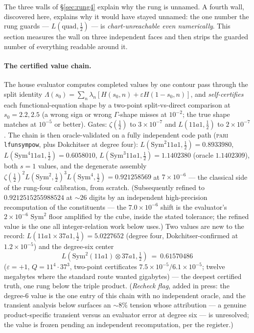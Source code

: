 \documentclass[11pt]{article}
\theoremstyle{definition}
\theoremstyle{remark}
\begin{document}
The three walls of \S\ref{sec:rung4} explain why the rung is unnamed. A fourth
wall, discovered here, explains why it would have stayed unnamed: the one
number the rung guards --- $L(\mathrm{quad},\tfrac12)$ --- is
\emph{chart-unreachable even numerically}. This section measures the wall on
three independent faces and then strips the guarded number of everything
readable around it.

\paragraph{The certified value chain.} The house evaluator computes completed
values by one contour pass through the split identity
$\Lambda(s_0)=\sum_n\lambda_n[H(s_0,n)+\varepsilon H(1-s_0,n)]$, and
\emph{self-certifies} each functional-equation shape by a two-point
split-vs-direct comparison at $s_0=2.2,2.5$ (a wrong sign or wrong
$\Gamma$-shape misses at $10^{-2}$; the true shape matches at $10^{-5}$ or
better). Gates: $\zeta(\tfrac12)$ to $3\times10^{-7}$ and $L(11a1,\tfrac12)$
to $2\times10^{-7}$. The chain is then oracle-validated on a fully independent
code path (\textsc{pari} \texttt{lfunsympow}, plus Dokchitser at degree four):
$L(\mathrm{Sym}^2 11a1,\tfrac12)=0.8933980$,
$L(\mathrm{Sym}^4 11a1,\tfrac12)=0.6058010$,
$L(\mathrm{Sym}^3 11a1,\tfrac12)=1.1402380$ (oracle $1.1402309$), both $s=1$
values, and the degenerate assembly
$\zeta(\tfrac12)^2L(\mathrm{Sym}^2,\tfrac12)^3L(\mathrm{Sym}^4,\tfrac12)
=0.921258569$ at $7\times10^{-6}$ --- the classical side of the rung-four
calibration, from scratch. (Subsequently refined to
$0.9212515255988524$ at $\sim\!26$ digits by an independent high-precision
recomputation of the constituents --- the $7.0\times10^{-6}$ shift is the
evaluator's $2\times10^{-6}$ $\mathrm{Sym}^2$ floor amplified by the cube,
inside the stated tolerance; the refined value is the one all
integer-relation work below uses.) Two values are new to the record:
$L(11a1\times37a1,\tfrac12)=5.0227652$ (degree four, Dokchitser-confirmed at
$1.2\times10^{-5}$) and the degree-six center
\[
  L(\mathrm{Sym}^2(11a1)\otimes37a1,\tfrac12)\ =\ 0.61570486
\]
($\varepsilon=+1$, $Q=11^4\cdot37^3$, two-point certificates
$7.5\times10^{-5}/6.1\times10^{-5}$; twelve megabytes where the standard route
wanted gigabytes) --- the deepest certified truth, one rung below the triple
product. (\emph{Recheck flag}, added in press: the degree-6 value is the one
entry of this chain with no independent oracle, and the transient analysis
below surfaces an $\sim\!8\%$ tension whose attribution --- a genuine
product-specific transient versus an evaluator error at degree six --- is
unresolved; the value is frozen pending an independent recomputation, per the
register.)
\end{document}
